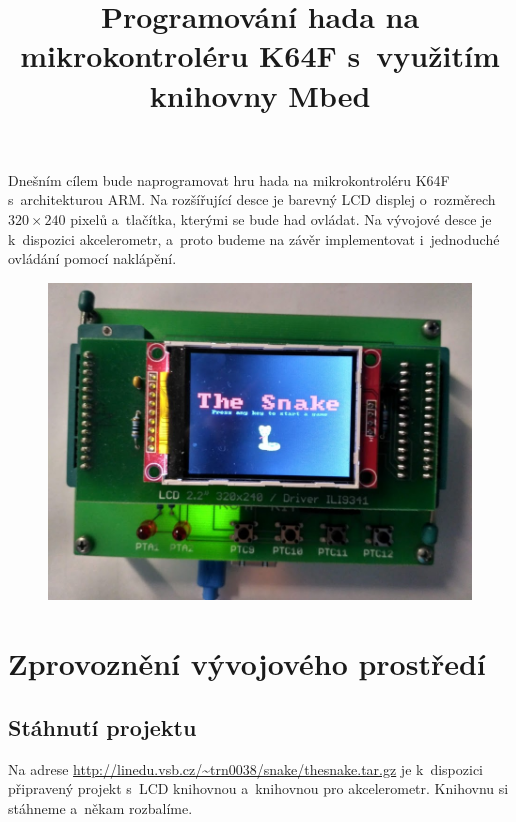 \documentclass[12pt]{article}
\title{Programování hada na mikrokontroléru K64F s~využitím knihovny Mbed}
\date{}
\begin{document}
\sloppy
\maketitle

Dnešním cílem bude naprogramovat hru hada na mikrokontroléru K64F s~architekturou ARM.
Na rozšířující desce je barevný LCD displej o~rozměrech $320 \times 240$ pixelů a~tlačítka, kterými se bude had ovládat.
Na vývojové desce je k~dispozici akcelerometr, a~proto budeme na závěr implementovat i~jednoduché ovládání pomocí naklápění.

\begin{figure}[h]
\includegraphics[width=\linewidth]{figures/snake}
\end{figure}




\section{Zprovoznění vývojového prostředí}
\subsection{Stáhnutí projektu}
Na adrese \url{http://linedu.vsb.cz/~trn0038/snake/thesnake.tar.gz} je k~dispozici připravený projekt s~LCD knihovnou a~knihovnou pro akcelerometr.
Knihovnu si stáhneme a~někam rozbalíme.
\end{document}
